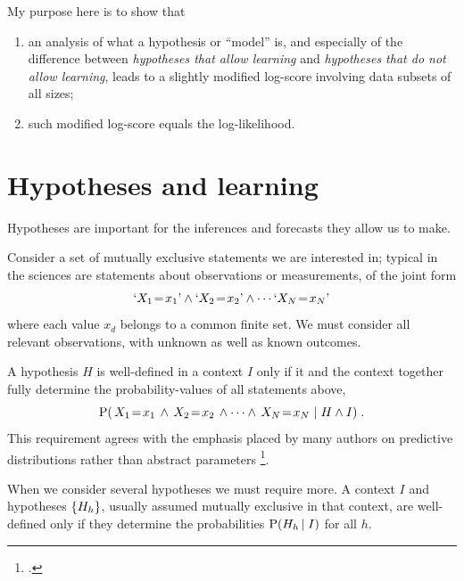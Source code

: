 \documentclass[\ifafour a4paper,12pt,\else a5paper,10pt,\fi%
onecolumn,oneside,article,%
british%
]{memoir}
\theoremstyle{remark}
\theoremstyle{innote}
\newcommand*{\citep}{\footcites}
\DeclarePairedDelimiter\set{\{}{\}}
\newcommand*{\p}{\mathrm{P}}%
\renewcommand*{\|}[1][]{\nonscript\,#1\vert\nonscript\;\mathopen{}}
\newcommand*{\eg}{{e.g.}}
\newcommand*{\prop}[1]{\text{\textquoteleft}#1\text{\textquoteright}}
\newcommand*{\propf}[1]{\,#1\,}
\newcommand*{\yK}{I}
\newcommand*{\eq}{\mathrel{\!=\!}}
\begin{document}
My purpose here is to show that
\begin{enumerate}[label=(\alph*)]
\item an analysis of what a hypothesis or \enquote{model} is, and
  especially of the difference between \emph{hypotheses that allow
    learning} and \emph{hypotheses that do not allow learning}, leads
  to a slightly modified log-score involving data subsets of all sizes;
\item such modified log-score equals the log-likelihood.
\end{enumerate}


\section{Hypotheses and learning}
\label{sec:hyp_learn}

Hypotheses are important for the inferences and forecasts they allow us to
make.

Consider a set of mutually exclusive statements we are interested in;
typical in the sciences are statements about observations or
measurements, of the joint form
\begin{equation}
  \label{eq:statements_interested}
  \prop{X_{1}\eq x_{1}} \land
  \prop{X_{2}\eq x_{2}} \land \dotsb
  \prop{X_{N}\eq x_{N}}
\end{equation}
where each value $x_{d}$ belongs to a common finite set. We must consider
all relevant observations, with unknown as well as known outcomes.

A hypothesis $H$ is well-defined in a context $\yK$ only if it and the
context together fully determine the probability-values of all statements
above,
\begin{equation}
  \label{eq:prob_stat_from_hyp}
  \p( \propf{X_{1}\eq x_{1}} \land
  \propf{X_{2}\eq x_{2}} \land \dotsb \land
  \propf{X_{N}\eq x_{N}} \| H \land \yK) \;.
\end{equation}
This requirement agrees with the emphasis placed by many authors on 
predictive distributions rather than abstract parameters
\citep[\eg][]{definetti1930,definetti1937,roberts1965,lauritzen1974,diaconis1988,bernardoetal1994_r2000,fortinietal2000,fortinietal2012}.

When we consider several hypotheses we must require more. A context $\yK$
and hypotheses $\set{H_{h}}$, usually assumed mutually exclusive in that
context, are well-defined only if they determine the probabilities
$\p( H_{h} \| \yK)$ for all $h$.
\end{document}
